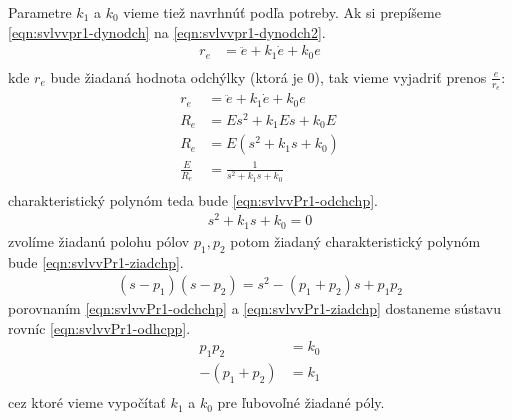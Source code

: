 \documentclass[../main.tex]{subfiles}
\begin{document}
    Parametre $k_1$ a $k_0$ vieme tiež navrhnúť podľa potreby. Ak si prepíšeme \cref{eqn:svlvvpr1-dynodch} na \cref{eqn:svlvvpr1-dynodch2}.
    \begin{equation}
        \begin{aligned}
	        r_e &= \ddot{e}  + k_1 \dot{e} + k_0 e \\
        \end{aligned}
        \label{eqn:svlvvpr1-dynodch2}
    \end{equation} 
    kde $r_e$ bude žiadaná hodnota odchýlky (ktorá je 0), tak vieme vyjadriť prenos $\frac{e}{r_e}$:
    \begin{equation*}
        \begin{aligned}
	        r_e &= \ddot{e}  + k_1 \dot{e} + k_0 e \\
            R_e &= Es^2  + k_1Es  + k_0E  \\
            R_e &= E(s^2  + k_1s  + k_0)  \\
            \frac{E}{R_e} &= \frac{1}{s^2  + k_1s  + k_0} \\
        \end{aligned}
        \label{eqn:}
    \end{equation*} 
    charakteristický polynóm teda bude \cref{eqn:svlvvPr1-odchchp}.
    \begin{equation}
        \begin{aligned}
            s^2  + k_1s  + k_0 = 0
        \end{aligned}
        \label{eqn:svlvvPr1-odchchp}
    \end{equation} 
    zvolíme žiadanú polohu pólov $p_1, p_2$ potom žiadaný charakteristický polynóm bude \cref{eqn:svlvvPr1-ziadchp}.
    \begin{equation}
        \begin{aligned}
            (s - p_1)(s-p_2) = s^2 - (p_1 + p_2)s + p_1p_2
        \end{aligned}
        \label{eqn:svlvvPr1-ziadchp}
    \end{equation} 
    porovnaním \cref{eqn:svlvvPr1-odchchp} a \cref{eqn:svlvvPr1-ziadchp} dostaneme sústavu rovníc \cref{eqn:svlvvPr1-odhcpp}.
    \begin{equation}
        \begin{aligned}
            p_1p_2 &= k_0 \\
            -(p_1 + p_2) &= k_1 \\
        \end{aligned}
        \label{eqn:svlvvPr1-odhcpp}
    \end{equation} 
    cez ktoré vieme vypočítať $k_1$ a $k_0$ pre ľubovoľné žiadané póly.
\end{document}
